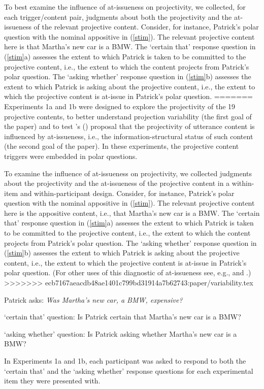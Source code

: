 \documentclass[11pt,fleqn]{article}
\newcommand{\6}{\mbox{$[\hspace*{-.6mm}[$}}
\newcommand{\9}{\mbox{$]\hspace*{-.6mm}]$}}
\newcommand{\citetpos}[1]{\citeauthor{#1}'s (\citeyear{#1})}
\begin{document}
To best examine the influence of at-issueness on projectivity, we collected, for each trigger/content pair, judgments about both the projectivity and the at-issueness of the relevant projective content. Consider, for instance, Patrick's polar question with the nominal appositive in (\ref{stim}). The relevant projective content here is that Martha's new car is a BMW. The `certain that' response question in (\ref{stim}a) assesses the extent to which Patrick is taken to be committed to the projective content, i.e., the extent to which the content projects from Patrick's polar question. The `asking whether' response question in (\ref{stim}b) assesses the extent to which Patrick is asking about the projective content, i.e., the extent to which the projective content is at-issue in Patrick's polar question. 
=======
Experiments 1a and 1b were designed to explore the projectivity of the 19 projective contents, to better understand projection variability (the first goal of the paper) and to test \citetpos{brst-salt10} proposal that the projectivity of utterance content is influenced by at-issueness, i.e., the information-structural status of such content (the second goal of the paper). In these experiments, the projective content triggers were embedded in polar questions.

To examine the influence of at-issueness on projectivity, we collected judgments about the projectivity and the at-issueness of the projective content in a within-item and within-participant design. Consider, for instance, Patrick's polar question with the nominal appositive in (\ref{stim}). The relevant projective content here is the appositive content, i.e., that Martha's new car is a BMW. The `certain that' response question in (\ref{stim}a) assesses the extent to which Patrick is taken to be committed to the projective content, i.e., the extent to which the content projects from Patrick's polar question. The `asking whether' response question in (\ref{stim}b) assesses the extent to which Patrick is asking about the projective content, i.e., the extent to which the projective content is at-issue in Patrick's polar question. (For other uses of this diagnostic of at-issueness see, e.g., \citealt{amaral-etal07} and \citealt{tonhauser-sula6}.)
>>>>>>> ecb7167aeacdb48ae1401c799bd31914a7b62743:paper/variability.tex

\begin{exe}

\ex\label{stim} Patrick asks: {\em Was Martha's new car, a BMW, expensive?} 

\begin{xlist}
\ex `certain that' question: Is Patrick certain that Martha's new car is a BMW?

\ex `asking whether' question: Is Patrick asking whether Martha's new car is a BMW?

\end{xlist}

\end{exe}
In Experiments 1a and 1b, each participant was asked to respond to both the `certain that'  and the `asking whether' response questions for each experimental item they were presented with.
\end{document}
